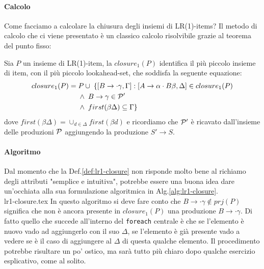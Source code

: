 \documentclass[class=book, crop=false, oneside, 12pt]{standalone}
\begin{document}
\paragraph{Calcolo}
Come facciamo a calcolare la chiusura degli insiemi di LR(1)-items? Il metodo di calcolo che ci viene presentato è un classico calcolo risolvibile grazie al teorema del punto fisso:
\begin{definition}
    \label{def:lr1-closure}
    Sia \(P\) un insieme di LR(1)-item, la \(closure_1(P)\) identifica il più piccolo insieme di item, con il più piccolo lookahead-set, che soddisfa la seguente equazione:
    \begin{align*}
        closure_1(P) =\; &P \cup \; \{[B \rightarrow \cdot \gamma, \Gamma] : [A \rightarrow \alpha \cdot B \beta, \Delta] \in closure_1(P) \\ 
        & \land \; B \rightarrow \gamma \in \P' \\
        & \land \; first(\beta \Delta) \subseteq \Gamma\}
    \end{align*}  
    dove \(first(\beta \Delta) = \cup_{d \in \Delta} first(\beta d)\) e ricordiamo che \(\P'\) è ricavato dall'insieme delle produzioni \(\P\) aggiungendo la produzione \(S' \to S\).
\end{definition}
\paragraph{Algoritmo}
Dal momento che la Def.\ref{def:lr1-closure} non risponde molto bene al richiamo degli attributi "semplice e intuitiva", potrebbe essere una buona idea dare un'occhiata alla sua formulazione algoritmica in Alg.\ref{alg:lr1-closure}. \\
{lr1-closure.tex}
In questo algoritmo si deve fare conto che \(B \to \cdot \gamma \notin prj(P)\) significa che non è ancora presente in \(closure_1(P)\) una produzione \(B \to \cdot \gamma\).
Di fatto quello che succede all'interno del \texttt{foreach} centrale è che se l'elemento è nuovo vado ad aggiungerlo con il suo \(\Delta\), se l'elemento è già presente vado a vedere se è il caso di aggiungere al \(\Delta\) di questa qualche elemento. Il procedimento potrebbe risultare un po' ostico, ma sarà tutto più chiaro dopo qualche esercizio esplicativo, come al solito.
\end{document}
